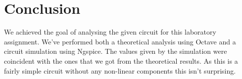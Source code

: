\section{Conclusion}
\label{sec:conclusion}

We achieved the goal of analysing the given circuit for this laboratory assignment. We've performed both a theoretical analysis using Octave and a circuit simulation using Ngspice. The values given by the simulation were coincident with the ones that we got from the theoretical results. As this is a fairly simple circuit without any non-linear components this isn't surprising. 
